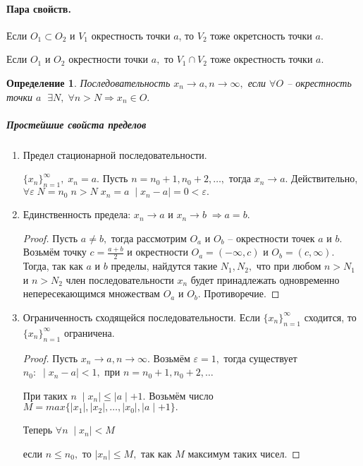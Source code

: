 \documentclass{article}
\newtheorem{Definition}{Определение}[section]
\begin{document}
\paragraph{Пара свойств.}

Если $O_1 \subset O_2$ и $V_1$ окрестность точки $a$, то $V_2$ тоже окретсность точки $a.$

Если $O_1$ и $O_2$ окрестности точки $a,$ то $V_1\cap V_2$ тоже окрестность точки $a.$

\begin{Definition}
Последовательность $x_n \rightarrow a, n\rightarrow \infty,$ если $\forall O$ -- окрестность точки $a\;$  $\exists N, \; \forall n>N \Rightarrow x_n\in O.$
\end{Definition}

\subparagraph{Простейшие свойста пределов}
\begin{enumerate}
\item Предел стационарной последовательности. 

$\{x_n\}_{n=1}^{\infty}, \; x_n=a.$ Пусть $n=n_0+1, n_0+2,\ldots,$ тогда $x_n\rightarrow a.$ Действительно, $\forall\varepsilon \; N=n_0 \; n>N \; x_n=a \; \mid x_n-a\mid=0<\varepsilon.$
\item Единственность предела:  $x_n\rightarrow a$ и $x_n\rightarrow b \; \Rightarrow a=b.$
\begin{proof}
Пусть $a\neq b,$ тогда рассмотрим $O_a$ и $O_b$ -- окрестности точек $a$ и $b.$ Возьмём точку $c=\frac{a+b}{2}$ и окрестности $O_a = (-\infty, c)$ и $O_b = (c, \infty).$ Тогда, так как $a$ и $b$ пределы, найдутся такие $N_1, N_2,$ что при любом $n>N_1$ и $n>N_2$ член последовательности $x_n$ будет принадлежать одновременно непересекающимся множествам $O_a$ и $O_b.$ Противоречие.
\end{proof}
\item Ограниченность сходящейся последовательности. Если $\{x_n\}_{n=1}^{\infty}$ сходится, то $\{x_n\}_{n=1}^{\infty}$ ограничена.
\begin{proof}
Пусть $x_n \rightarrow a, n\rightarrow\infty.$ Возьмём $\varepsilon=1,$ тогда существует $n_0: \; \mid x_n-a\mid<1,$ при $n=n_0+1, n_0+2,\ldots$

При таких $n\; \mid x_n\mid\leq\mid a\mid+1.$ Возьмём число $M=max\{\mid x_1\mid, \mid x_2\mid,\ldots,\mid x_0\mid, \mid a\mid+1\}.$

Теперь $\forall n \; \mid x_n\mid<M$

если $n\leq n_0,$ то $\mid x_n\mid\leq M,$ так как $M$ максимум таких чисел.


\end{proof}
\end{enumerate}
\end{document}

